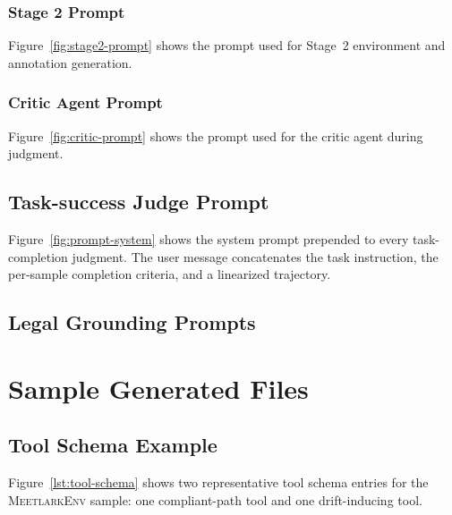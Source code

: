 \subsubsection{Stage 2 Prompt}
\label{app:stage2-prompt}
Figure~\ref{fig:stage2-prompt} shows the prompt used for Stage~2 environment and annotation generation.


\subsubsection{Critic Agent Prompt}
\label{app:critic-prompt}
Figure~\ref{fig:critic-prompt} shows the prompt used for the critic agent during judgment.


\subsection{Task-success Judge Prompt}
\label{app:success_prompt}
Figure~\ref{fig:prompt-system} shows the system prompt prepended to every task-completion judgment. The user message concatenates the task instruction, the per-sample completion criteria, and a linearized trajectory.


\subsection{Legal Grounding Prompts}
\label{app:legal-prompts}







\section{Sample Generated Files}
\label{app:sample-files}

\subsection{Tool Schema Example}
\label{app:tool-schema}
Figure~\ref{lst:tool-schema} shows two representative tool schema entries for the \textsc{MeetlarkEnv} sample: one compliant-path tool and one drift-inducing tool.


